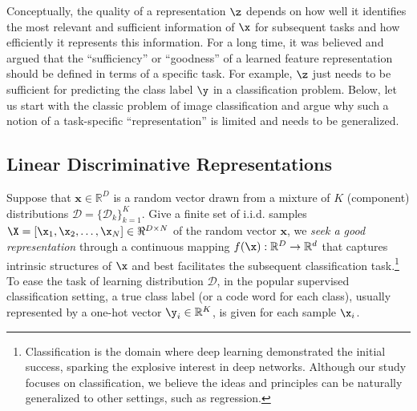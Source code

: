 \documentclass[../../book-main.tex]{subfiles}
\begin{document}
Conceptually, the quality of a representation $\z$ depends on how well it identifies the most relevant and sufficient information of $\x$ for subsequent tasks and how efficiently it represents this information.
For a long time, it was believed and argued that the ``sufficiency'' or ``goodness'' of a learned feature representation should be defined in terms of a specific task. For example, $\z$ just needs to be sufficient for predicting the class label $\y$ in a classification problem. Below, let us start with the classic problem of image classification and argue why such a notion of a task-specific ``representation'' is limited and needs to be generalized.















\subsection{Linear Discriminative Representations}\label{subsec:LDR}

Suppose that $\bm{x} \in \mathbb{R}^D$ is a random vector drawn from a mixture of $K$ (component) distributions  $\mathcal{D} = \{\mathcal{D}_k\}_{k=1}^K$. Give a finite set of i.i.d. samples $\X = [\x_1, \x_2, \ldots, \x_N] \in \Re^{D\times N}$ of the random vector $\bm x$, we {\em seek a good representation}  through a continuous mapping $f(\x): \mathbb{R}^D \rightarrow \mathbb{R}^d$ that captures intrinsic structures of $\x$ and best facilitates the subsequent classification task.\footnote{Classification is the domain where deep learning demonstrated the initial success, sparking the explosive interest in deep networks. Although our study focuses on classification, we believe the ideas and principles can be naturally generalized to other settings, such as regression.} To ease the task of learning distribution $\mathcal{D}$, in the popular supervised classification setting, a true class label (or a code word for each class), usually represented by a one-hot vector $\y_i \in \mathbb{R}^K$, is given for each sample $\x_i$.

 
\end{document}
